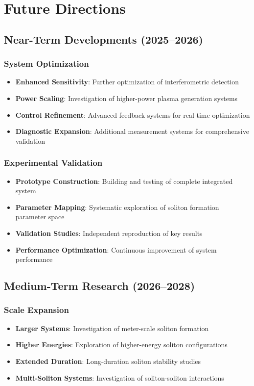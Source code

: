\documentclass[12pt,a4paper]{article}
\begin{document}
\section{Future Directions}

\subsection{Near-Term Developments (2025--2026)}

\subsubsection{System Optimization}
\begin{itemize}
\item \textbf{Enhanced Sensitivity}: Further optimization of interferometric detection
\item \textbf{Power Scaling}: Investigation of higher-power plasma generation systems
\item \textbf{Control Refinement}: Advanced feedback systems for real-time optimization
\item \textbf{Diagnostic Expansion}: Additional measurement systems for comprehensive validation
\end{itemize}

\subsubsection{Experimental Validation}
\begin{itemize}
\item \textbf{Prototype Construction}: Building and testing of complete integrated system
\item \textbf{Parameter Mapping}: Systematic exploration of soliton formation parameter space
\item \textbf{Validation Studies}: Independent reproduction of key results
\item \textbf{Performance Optimization}: Continuous improvement of system performance
\end{itemize}

\subsection{Medium-Term Research (2026--2028)}

\subsubsection{Scale Expansion}
\begin{itemize}
\item \textbf{Larger Systems}: Investigation of meter-scale soliton formation
\item \textbf{Higher Energies}: Exploration of higher-energy soliton configurations
\item \textbf{Extended Duration}: Long-duration soliton stability studies
\item \textbf{Multi-Soliton Systems}: Investigation of soliton-soliton interactions
\end{itemize}
\end{document}
